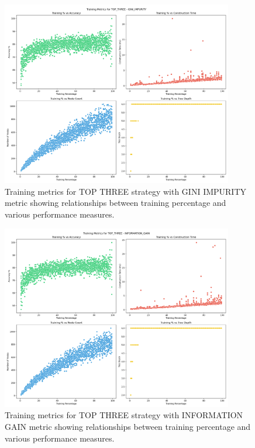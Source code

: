 \documentclass[12pt]{article}
\begin{document}
\begin{figure}[H]
    \centering
    \includegraphics[width=0.9\textwidth]{plots/training_metrics_TOP_THREE_GINI_IMPURITY.png}
    \caption{Training metrics for TOP THREE strategy with GINI IMPURITY metric showing relationships between training percentage and various performance measures.}
    \label{fig:training-top3-gini}
\end{figure}
\newpage

\begin{figure}[H]
    \centering
    \includegraphics[width=0.9\textwidth]{plots/training_metrics_TOP_THREE_INFORMATION_GAIN.png}
    \caption{Training metrics for TOP THREE strategy with INFORMATION GAIN metric showing relationships between training percentage and various performance measures.}
    \label{fig:training-top3-ig}
\end{figure}
\end{document}
